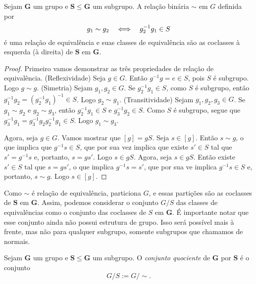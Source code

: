 \begin{proposition}
Sejam $\bm G$ um grupo e $\bm S \leq \bm G$ um subgrupo. A relação binária $\sim$ em $G$ definida por
	\begin{equation*}
	g_1 \sim g_2 \quad \Longleftrightarrow \quad g_2^{-1}g_1 \in S
	\end{equation*}
é uma relação de equivalência e suas classes de equivalência são as coclasses à esquerda (à direita) de $\bm S$ em $\bm G$.
\end{proposition}
\begin{proof}
Primeiro vamos demonstrar as três propriedades de relação de equivalência. (Reflexividade) Seja $g \in G$. Então $g^{-1}g=e \in S$, pois $S$ é subgrupo. Logo $g \sim g$. (Simetria) Sejam $g_1,g_2 \in G$. Se $g_2^{-1}g_1 \in S$, como $S$ é subgrupo, então $g_1^{-1}g_2=(g_2^{-1}g_1)^{-1} \in S$. Logo $g_2 \sim g_1$. (Transitividade) Sejam $g_1,g_2,g_3 \in G$. Se $g_1 \sim g_2$ e $g_2 \sim g_3$, então $g_2^{-1}g_1 \in S$ e $g_3^{-1}g_2 \in S$. Como $S$ é subgrupo, segue que $g_3^{-1}g_1=g_3^{-1}g_2g_2^{-1}g_1 \in S$. Logo $g_1 \sim g_3$.

Agora, seja $g \in G$. Vamos mostrar que $[g]=gS$. Seja $s \in [g]$. Então $s \sim g$, o que implica que $g^{-1}s \in S$, que por sua vez implica que existe $s' \in S$ tal que $s'=g^{-1}s$ e, portanto, $s=gs'$. Logo $s \in gS$. Agora, seja $s \in gS$. Então existe $s' \in S$ tal que $s=gs'$, o que implica $g^{-1}s=s'$, que por sua ve implica $g^{-1}s \in S$ e, portanto, $s \sim g$. Logo $s \in [g]$.
\end{proof}

Como $\sim$ é relação de equivalência, particiona $G$, e essas partições são as coclasses de $\bm S$ em $\bm G$. Assim, podemos considerar o conjunto $G/S$ das classes de equivalências como o conjunto das coclasses de $S$ em $\bm G$. É importante notar que esse conjunto ainda não possui estrutura de grupo. Isso será possível mais à frente, mas não para qualquer subgrupo, somente subgrupos que chamamos de normais.

\begin{definition}
Sejam $\bm G$ um grupo e $\bm S \leq \bm G$ um subgrupo. O \emph{conjunto quociente} de $\bm G$ por $\bm S$ é o conjunto
	\begin{equation*}
	G/S := G/\sim.
	\end{equation*}
\end{definition}

